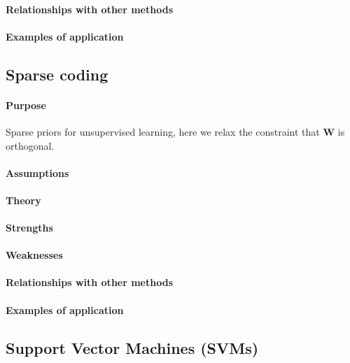 \paragraph{Relationships with other methods}
\paragraph{Examples of application}



\subsection{Sparse coding}
\paragraph{Purpose}
Sparse priors for unsupervised learning, here we relax the constraint that $\bm{W}$
is orthogonal. 
\paragraph{Assumptions}
\paragraph{Theory}
\paragraph{Strengths}
\paragraph{Weaknesses}
\paragraph{Relationships with other methods}
\paragraph{Examples of application}

\subsection{Support Vector Machines (SVMs)}
